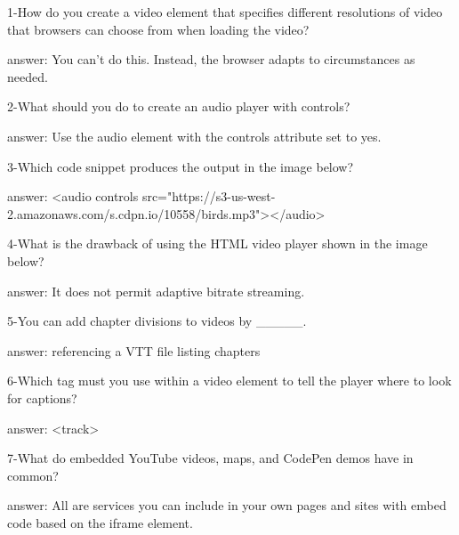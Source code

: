 1-How do you create a video element that specifies different resolutions of video that browsers can choose from when loading the video?

answer: You can't do this. Instead, the browser adapts to circumstances as needed.

2-What should you do to create an audio player with controls?

answer: Use the audio element with the controls attribute set to yes.

3-Which code snippet produces the output in the image below? 

answer: <audio controls src="https://s3-us-west-2.amazonaws.com/s.cdpn.io/10558/birds.mp3"></audio>

4-What is the drawback of using the HTML video player shown in the image below? 

answer: It does not permit adaptive bitrate streaming.

5-You can add chapter divisions to videos by _____.

answer: referencing a VTT file listing chapters

6-Which tag must you use within a video element to tell the player where to look for captions?

answer: <track>

7-What do embedded YouTube videos, maps, and CodePen demos have in common?

answer: All are services you can include in your own pages and sites with embed code based on the iframe element.



